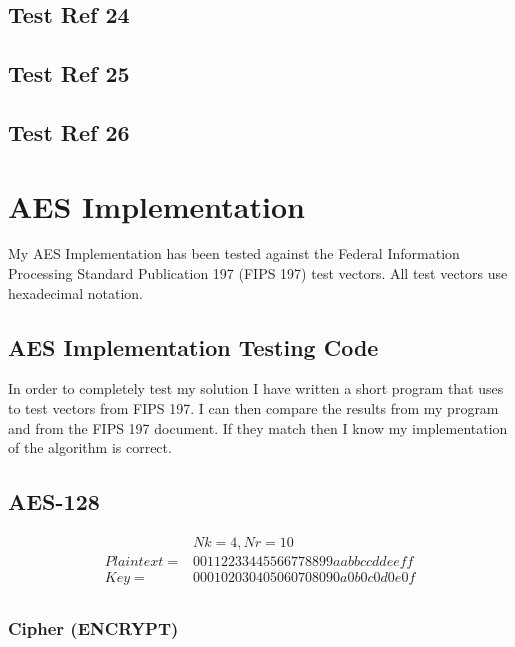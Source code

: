 \subsection{Test Ref 24}
\subsection{Test Ref 25}
\subsection{Test Ref 26}

\newpage
\section{AES Implementation}

My AES Implementation has been tested against the Federal Information Processing Standard Publication 197 (FIPS 197) test vectors. All test vectors use hexadecimal notation.

\subsection{AES Implementation Testing Code}

In order to completely test my solution I have written a short program that uses to test vectors from FIPS 197. I can then compare the results from my program and from the FIPS 197 document. If they match then I know my implementation of the algorithm is correct.



\subsection{AES-128}

\begin{align*}
&Nk=4, Nr=10 \\
Plaintext = &00112233445566778899aabbccddeeff \\
Key = &000102030405060708090a0b0c0d0e0f \\
\end{align*}

\subsubsection{Cipher (ENCRYPT)}

